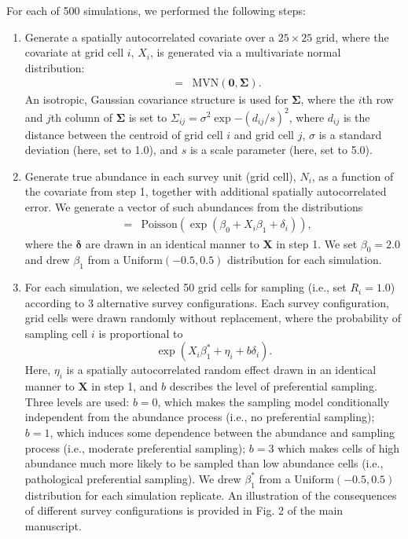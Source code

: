\documentclass[times,mee,doublespace,]{besauth2}
\begin{document}
\begin{flushleft}
For each of 500 simulations, we performed the following steps:

\begin{enumerate}
  \item Generate a spatially autocorrelated covariate over a $25 \times 25$ grid, where the covariate at grid cell $i$, $X_i$, is generated via a multivariate normal distribution:
      \begin{eqnarray}
        [\textbf{X}] & = & \textrm{MVN} (\textbf{0},\boldsymbol{\Sigma}).
        \label{eq:cov}
      \end{eqnarray}
      An isotropic, Gaussian covariance structure is used for $\boldsymbol{\Sigma}$, where the $i$th row and $j$th column of $\boldsymbol{\Sigma}$ is set to $\Sigma_{ij}=\sigma^2 \exp{-(d_{ij}/s)^2}$, where $d_{ij}$ is the distance between the centroid of grid cell $i$ and grid cell $j$, $\sigma$ is a standard deviation (here, set to 1.0), and $s$ is a scale parameter (here, set to 5.0).
  \item Generate true abundance in each survey unit (grid cell), $N_i$, as a function of the covariate from step 1, together with additional spatially autocorrelated error.  We generate a vector of such abundances from the distributions
      \begin{eqnarray}
        [N_i] & = & \textrm{Poisson}(\exp(\beta_0 + X_i \beta_1 + \delta_i)),
      \end{eqnarray}
      where the $\boldsymbol{\delta}$ are drawn in an identical manner to $\textbf{X}$ in step 1.  We set $\beta_0 = 2.0$ and drew $\beta_1$ from a $\textrm{Uniform}(-0.5,0.5)$ distribution for each simulation.
  \item For each simulation, we selected 50 grid cells for sampling (i.e., set $R_i = 1.0$) according to 3 alternative survey configurations.  Each survey configuration, grid cells were drawn randomly without replacement, where the probability of sampling cell $i$ is proportional to
      \begin{equation*}
        \exp(X_i \beta_1^*  + \eta_i + b \delta_i).
      \end{equation*}
      Here, $\eta_i$ is a spatially autocorrelated random effect drawn in an identical manner to $\textbf{X}$ in step 1, and $b$ describes the level of preferential sampling.  Three levels are used: $b=0$, which makes the sampling model conditionally independent from the abundance process (i.e., no preferential sampling); $b=1$, which induces some dependence between the abundance and sampling process (i.e., moderate preferential sampling); $b=3$ which makes cells of high abundance much more likely to be sampled than low abundance cells (i.e., pathological preferential sampling).   We drew $\beta_1^*$ from a  $\textrm{Uniform}(-0.5,0.5)$ distribution for each simulation replicate.  An illustration of the consequences of different survey configurations is provided in Fig. 2 of the main manuscript.

\end{enumerate}
\end{flushleft}
\end{document}
